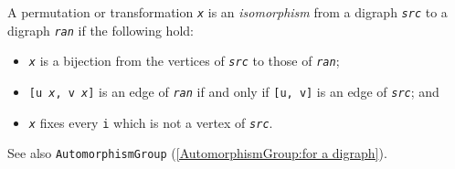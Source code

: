 \documentclass[a4paper,11pt]{report}
\begin{document}
{{{ A permutation or transformation \mbox{\texttt{\mdseries\slshape x}} is an \emph{isomorphism} from a digraph \mbox{\texttt{\mdseries\slshape src}} to a digraph \mbox{\texttt{\mdseries\slshape ran}} if the following hold: 
\begin{itemize}
\item  \mbox{\texttt{\mdseries\slshape x}} is a bijection from the vertices of \mbox{\texttt{\mdseries\slshape src}} to those of \mbox{\texttt{\mdseries\slshape ran}}; 
\item  \texttt{[u \texttt{} \mbox{\texttt{\mdseries\slshape x}}, v \texttt{} \mbox{\texttt{\mdseries\slshape x}}]} is an edge of \mbox{\texttt{\mdseries\slshape ran}} if and only if \texttt{[u, v]} is an edge of \mbox{\texttt{\mdseries\slshape src}}; and 
\item  \mbox{\texttt{\mdseries\slshape x}} fixes every \texttt{i} which is not a vertex of \mbox{\texttt{\mdseries\slshape src}}. 
\end{itemize}
 See also \texttt{AutomorphismGroup} (\ref{AutomorphismGroup:for a digraph}).

}}}
\end{document}
